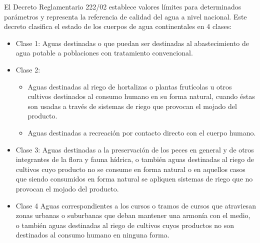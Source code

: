 El Decreto Reglamentario 222/02 establece valores límites para determinados parámetros y representa la referencia de calidad del agua a nivel nacional. Este decreto clasifica el estado de los cuerpos de agua continentales en 4 clases:
\begin{itemize}
    \item Clase 1:
    Aguas destinadas o que puedan ser destinadas al abastecimiento de agua potable a poblaciones con tratamiento convencional.
    \item Clase 2:
    \begin{itemize}
        \item Aguas destinadas al riego de hortalizas o plantas frutícolas u otros cultivos destinados al consumo humano en su forma natural, cuando éstas son usadas a través de sistemas de riego que provocan el mojado del producto.
        \item Aguas destinadas a recreaci\'on por contacto directo con el cuerpo humano.
    \end{itemize}
    \item Clase 3:
    Aguas destinadas a la preservaci\'on de los peces en general y de otros integrantes de la flora y fauna h\'idrica, o tambi\'en aguas destinadas al riego de cultivos cuyo producto no se consume en forma natural o en aquellos casos que siendo consumidos en forma natural se apliquen sistemas de riego que no provocan el mojado del producto.
    \item Clase 4
    Aguas correspondientes a los cursos o tramos de cursos que atraviesan zonas urbanas o suburbanas que deban mantener una armonía con el medio, o también aguas destinadas al riego de cultivos cuyos productos no son destinados al consumo humano en ninguna forma.

\end{itemize}

